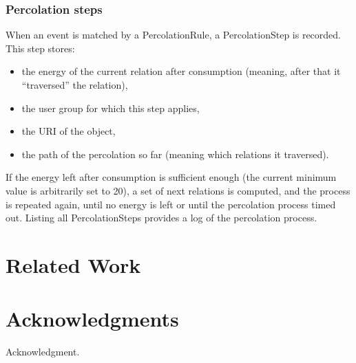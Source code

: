 \documentclass{ecscw2007}
\begin{document}
\subsubsection*{Percolation steps}
When an event is matched by a PercolationRule, a PercolationStep is recorded. This step stores:
\begin{itemize}
	\item the energy of the current relation after consumption (meaning, after that it ``traversed'' the relation),
    \item the user group for which this step applies,
    \item the URI of the object,
    \item the path of the percolation so far (meaning which relations it traversed).
\end{itemize}
    
If the energy left after consumption is sufficient enough (the current minimum value is arbitrarily set to 20), a set of next relations is computed, and the process is repeated again, until no energy is left or until the percolation process timed out.
Listing all PercolationSteps provides a log of the percolation process.

\section*{Related Work} 



\section*{Acknowledgments} 

{\footnotesize Acknowledgment. }




  
\end{document}
